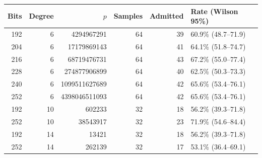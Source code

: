\begin{tabular}{rrrrrl}
\toprule
Bits & Degree & $p$ & Samples & Admitted & Rate (Wilson 95\%)\\
\midrule
192 & 6 & 4294967291 & 64 & 39 & 60.9\% (48.7--71.9)\\
204 & 6 & 17179869143 & 64 & 41 & 64.1\% (51.8--74.7)\\
216 & 6 & 68719476731 & 64 & 43 & 67.2\% (55.0--77.4)\\
228 & 6 & 274877906899 & 64 & 40 & 62.5\% (50.3--73.3)\\
240 & 6 & 1099511627689 & 64 & 42 & 65.6\% (53.4--76.1)\\
252 & 6 & 4398046511093 & 64 & 42 & 65.6\% (53.4--76.1)\\
192 & 10 & 602233 & 32 & 18 & 56.2\% (39.3--71.8)\\
252 & 10 & 38543917 & 32 & 23 & 71.9\% (54.6--84.4)\\
192 & 14 & 13421 & 32 & 18 & 56.2\% (39.3--71.8)\\
252 & 14 & 262139 & 32 & 17 & 53.1\% (36.4--69.1)\\
\bottomrule
\end{tabular}
